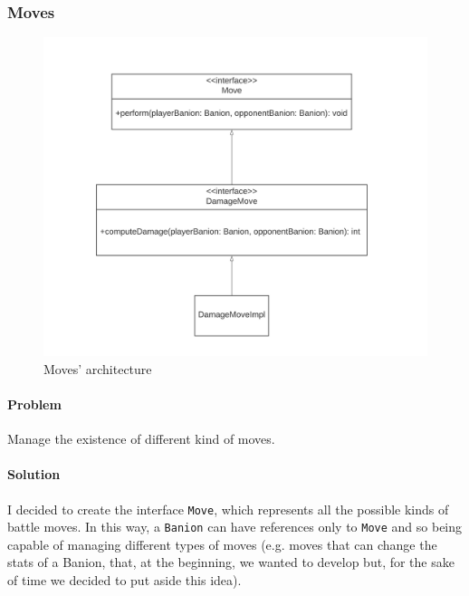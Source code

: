 \documentclass[12pt, a4paper]{report}
\theoremstyle{definition}
\begin{document}
        \subsubsection{Moves}

            \begin{figure}[H]
                \centering{}
                \caption{Moves' architecture}
                \includegraphics[width=\textwidth]{moves}
            \end{figure}
        
            \paragraph{Problem}

            Manage the existence of different kind of moves.

            \paragraph{Solution}

            I decided to create the interface \verb|Move|, which represents all the possible kinds of battle moves. In this way, a \verb|Banion|
            can have references only to \verb|Move| and so being capable of managing different types of moves (e.g. moves that can
            change the stats of a Banion, that, at the beginning, we wanted to develop but, for the sake of time we decided to put aside this idea).
\end{document}
